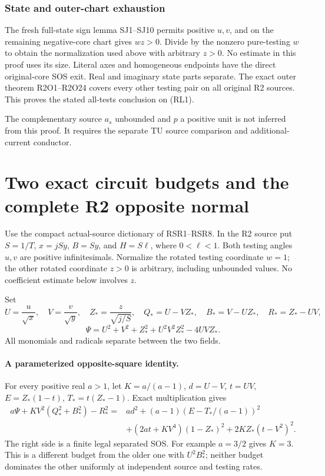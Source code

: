 \subsubsection*{State and outer-chart exhaustion}

The fresh full-state sign lemma SJ1--SJ10 permits positive
\(u,v\), and on the remaining negative-core chart gives
\(wz>0\).  Divide by the nonzero pure-testing \(w\) to obtain
the normalization used above with arbitrary \(z>0\).
No estimate in this proof uses its size.  Literal axes and
homogeneous endpoints have the direct original-core SOS exit.
Real and imaginary state parts separate.
The exact outer theorem R2O1--R2O24 covers every other testing
pair on all original R2 sources.  This proves the stated
all-tests conclusion on (RL1).

The complementary source \(a_s\) unbounded and \(p\) a positive
unit is not inferred from this proof.  It requires the separate
TU source comparison and additional-current conductor.


\section{\texorpdfstring{Two exact circuit budgets and the complete R2 opposite normal}{Two exact circuit budgets and the complete R2 opposite normal}}
\label{component:p09b2107cc05e}


Use the compact actual-source dictionary of RSR1--RSR8.  In the R2
source put \(S=1/T\), \(x=jSy\), \(B=Sy\), and \(H=S\ell\), where
\(0<\ell<1\).  Both testing angles \(u,v\) are positive
infinitesimals.  Normalize the rotated testing coordinate \(w=1\);
the other rotated coordinate \(z>0\) is arbitrary, including
unbounded values.  No coefficient estimate below involves \(z\).

Set
\[
 U=\frac{u}{\sqrt x},\quad V=\frac v{\sqrt y},\quad
 Z_*=\frac z{\sqrt{j/S}},\quad
 Q_*=U-VZ_*,\quad B_*=V-UZ_*,\quad R_*=Z_*-UV,
\]
\[
 \Psi=U^2+V^2+Z_*^2+U^2V^2Z_*^2-4UVZ_*.
\]
All monomials and radicals separate between the two fields.

\paragraph{A parameterized opposite-square identity.}
For every positive real \(a>1\), let \(K=a/(a-1)\),
\(d=U-V\), \(t=UV\), \(E=Z_*(1-t)\), \(T_*=t(Z_*-1)\).
Exact multiplication gives
\[
\begin{split}
 a\Psi+K V^2(Q_*^2+B_*^2)-R_*^2
 ={}&a d^2+(a-1)(E-T_*/(a-1))^2\\
 &+(2at+KV^4)(1-Z_*)^2+2KZ_*(t-V^2)^2 .
\end{split}                                                     \tag{SH1}
\]
The right side is a finite legal separated SOS.  For example
\(a=3/2\) gives \(K=3\).  This is a different budget from the
older one with \(U^2B_*^2\); neither budget dominates the other
uniformly at independent source and testing rates.


